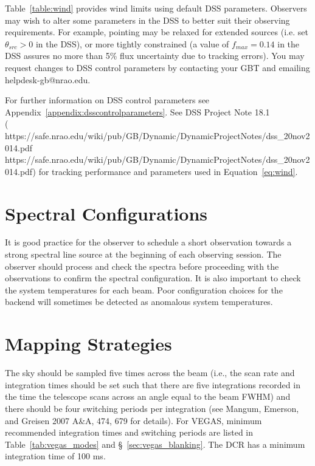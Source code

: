 Table~\ref{table:wind} provides wind limits using default \gls{DSS} parameters.
Observers may wish to alter some parameters in the \gls{DSS} to better suit their observing
requirements.  For example, pointing may be relaxed for extended sources (i.e.
set $\theta_{src}>0$ in the \gls{DSS}), or more tightly constrained (a value of $f_{max}=0.14$
in the \gls{DSS} assures no more than 5\% flux uncertainty due to tracking errors).
You may request changes to DSS control parameters by contacting your \gls{GBT} 
and emailing helpdesk-gb@nrao.edu.

For further information on \gls{DSS} control parameters see
Appendix~\ref{appendix:dsscontrolparameters}. See DSS Project Note 18.1\\
(\htmladdnormallink
{https://safe.nrao.edu/wiki/pub/GB/Dynamic/DynamicProjectNotes/dss\_20nov2014.pdf}
{https://safe.nrao.edu/wiki/pub/GB/Dynamic/DynamicProjectNotes/dss_20nov2014.pdf})
for tracking performance and parameters used in Equation~\ref{eq:wind}.

\newpage

\section{Spectral Configurations}

It is good practice for the observer to schedule a short observation
towards a strong spectral line source at the beginning of each observing
session.  The observer should process and check the spectra before
proceeding with the observations to confirm the spectral configuration.
It is also important to check the system temperatures for each beam.
Poor configuration choices for the backend will sometimes be detected as
anomalous system temperatures.


\section{Mapping Strategies}

The sky should be sampled five times across the beam (i.e., the scan rate and
integration times should be set such that there are five integrations recorded
in the time the telescope scans across an angle equal to the beam FWHM) and
there should be four switching periods per integration (see Mangum, Emerson,
and Greisen 2007 A\&A, 474, 679 for details).  For \gls{VEGAS}, minimum recommended
integration times and switching periods are listed in Table~\ref{tab:vegas_modes}
and \S~\ref{sec:vegas_blanking}.  The \gls{DCR} has a minimum integration time of
100 ms.

